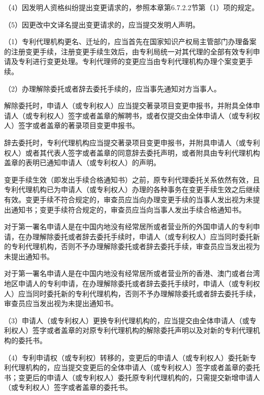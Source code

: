 {\setlength{\parindent}{17.1bp}（4）因发明人资格纠纷提出变更请求的，参照本章第6.7.2.2节第（1）项的规定。\par}

{\setlength{\parindent}{17.1bp}（5）因更改中文译名提出变更请求的，应当提交发明人声明。\par}

{\setlength{\parindent}{17.1bp}（1）专利代理机构更名、迁址的，应当首先在国家知识产权局主管部门办理备案的注册变更手续，注册变更手续生效后，由专利局统一对其代理的全部有效专利申请及专利进行变更处理。专利代理师的变更应当由专利代理机构办理个案变更手续。\par}

{\setlength{\parindent}{17.1bp}（2）办理解除委托或者辞去委托手续的，应当事先通知对方当事人。\par}

解除委托时，申请人（或专利权人）应当提交著录项目变更申报书，并附具全体申请人（或专利权人）签字或者盖章的解聘书，或者仅提交由全体申请人（或专利权人）签字或者盖章的著录项目变更申报书。

辞去委托时，专利代理机构应当提交著录项目变更申报书，并附具申请人（或专利权人）或者其代表人签字或者盖章的同意辞去委托声明，或者附具由专利代理机构盖章的表明已通知申请人（或专利权人）的声明。

变更手续生效（即发出手续合格通知书）之前，原专利代理委托关系依然有效，且专利代理机构已为申请人（或专利权人）办理的各种事务在变更手续生效之后继续有效。变更手续不符合规定的，审查员应当向办理变更手续的当事人发出视为未提出通知书；变更手续符合规定的，审查员应当向当事人发出手续合格通知书。

对于第一署名申请人是在中国内地没有经常居所或者营业所的外国申请人的专利申请，在办理解除委托或者辞去委托手续时，申请人（或专利权人）应当同时委托新的专利代理机构，否则不予办理解除委托或者辞去委托手续，审查员应当发出视为未提出通知书。

对于第一署名申请人是在中国内地没有经常居所或者营业所的香港、澳门或者台湾地区申请人的专利申请，在办理解除委托或者辞去委托手续时，申请人（或专利权人）应当同时委托新的专利代理机构，否则不予办理解除委托或者辞去委托手续，审查员应当发出视为未提出通知书。

{\setlength{\parindent}{17.1bp}（3）申请人（或专利权人）更换专利代理机构的，应当提交由全体申请人（或专利权人）签字或者盖章的对原专利代理机构的解除委托声明以及对新的专利代理机构的委托书。\par}

{\setlength{\parindent}{17.1bp}（4）专利申请权（或专利权）转移的，变更后的申请人（或专利权人）委托新专利代理机构的，应当提交变更后的全体申请人（或专利权人）签字或者盖章的委托书；变更后的申请人（或专利权人）委托原专利代理机构的，只需提交新增申请人（或专利权人）签字或者盖章的委托书。\par}

